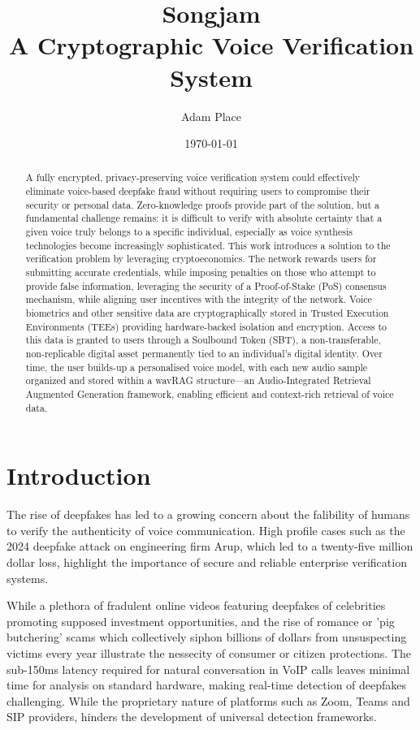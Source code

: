 \documentclass[11pt,a4paper]{article}
\title{Songjam\\[0.5em]\large A Cryptographic Voice Verification System}
\author{Adam Place}
\date{\today}
\begin{document}
\maketitle

\begin{abstract}
A fully encrypted, privacy-preserving voice verification system could effectively eliminate voice-based deepfake fraud without requiring users to compromise their security or personal data.
Zero-knowledge proofs provide part of the solution, but a fundamental challenge remains: it is difficult to verify with absolute certainty that a given voice truly belongs to a specific individual, especially as voice synthesis technologies become increasingly sophisticated.
This work introduces a solution to the verification problem by leveraging cryptoeconomics.
The network rewards users for submitting accurate credentials, while imposing penalties on those who attempt to provide false information, leveraging the security of a Proof-of-Stake (PoS) consensus mechanism, while aligning user incentives with the integrity of the network.
Voice biometrics and other sensitive data are cryptographically stored in Trusted Execution Environments (TEEs) providing hardware-backed isolation and encryption.
Access to this data is granted to users through a Soulbound Token (SBT), a non-transferable, non-replicable digital asset permanently tied to an individual’s digital identity.
Over time, the user builds-up a personalised voice model, with each new audio sample organized and stored within a wavRAG structure—an Audio-Integrated Retrieval Augmented Generation framework, enabling efficient and context-rich retrieval of voice data.
\end{abstract}

\section{Introduction}
\label{sec:introduction}
The rise of deepfakes has led to a growing concern about the falibility of humans to verify the authenticity of voice communication.
High profile cases such as the 2024 deepfake attack on engineering firm Arup, which led to a twenty-five million dollar loss, highlight the importance of secure and reliable enterprise verification systems.

While a plethora of fradulent online videos featuring deepfakes of celebrities promoting supposed investment opportunities, and the rise of romance or 'pig butchering' scams which collectively siphon billions of dollars from unsuspecting victims every year illustrate the nessecity of consumer or citizen protections.
The sub-150ms latency required for natural conversation in VoIP calls leaves minimal time for analysis on standard hardware, making real-time detection of deepfakes challenging. While the proprietary nature of platforms such as Zoom, Teams and SIP providers, hinders the development of universal detection frameworks.
\end{document}
